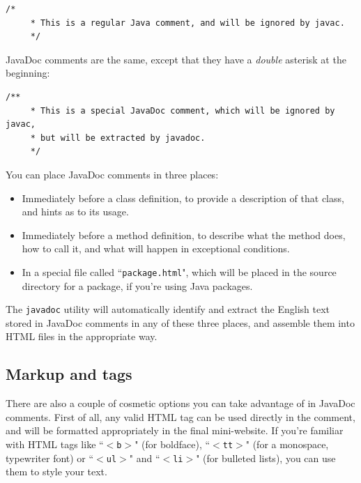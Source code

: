 \vspace{-.2in}
\begin{Verbatim}[fontsize=\footnotesize,samepage=true,frame=none]
    /*
     * This is a regular Java comment, and will be ignored by javac.
     */
\end{Verbatim}

JavaDoc comments are the same, except that they have a \textit{double}
asterisk at the beginning:

\begin{Verbatim}[fontsize=\footnotesize,samepage=true,frame=none]
    /**
     * This is a special JavaDoc comment, which will be ignored by javac,
     * but will be extracted by javadoc.
     */
\end{Verbatim}

You can place JavaDoc comments in three places:

\begin{itemize}
\itemsep.1em

\item Immediately before a class definition, to provide a description of that
class, and hints as to its usage.

\item Immediately before a method definition, to describe what the method
does, how to call it, and what will happen in exceptional conditions.

\item In a special file called ``\texttt{package.html}", which will be placed
in the source directory for a package, if you're using Java packages.

\end{itemize}

The \texttt{javadoc} utility will automatically identify and extract the
English text stored in JavaDoc comments in any of these three places, and
assemble them into HTML files in the appropriate way.

\subsection{Markup and tags}

There are also a couple of cosmetic options you can take advantage of in
JavaDoc comments. First of all, any valid HTML tag can be used directly in the
comment, and will be formatted appropriately in the final mini-website. If
you're familiar with HTML tags like ``\texttt{$<$b$>$}" (for boldface),
``\texttt{$<$tt$>$}" (for a monospace, typewriter font) or
``\texttt{$<$ul$>$}" and ``\texttt{$<$li$>$}" (for bulleted lists), you can
use them to style your text.

